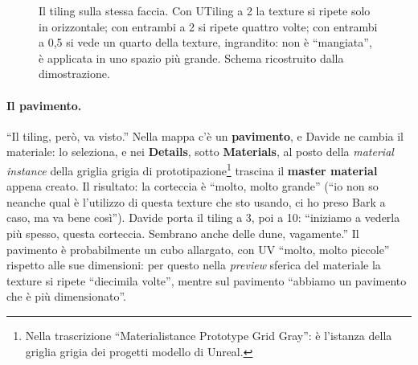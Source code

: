\begin{figure}[htbp]
\centering
{}
\caption{Il tiling sulla stessa faccia. Con UTiling a 2 la texture si ripete solo in
orizzontale; con entrambi a 2 si ripete quattro volte; con entrambi a 0,5 si vede un
quarto della texture, ingrandito: non è ``mangiata'', è applicata in uno spazio più
grande. Schema ricostruito dalla dimostrazione.}
\label{ue3:fig:tiling}
\end{figure}

\paragraph{Il pavimento.} ``Il tiling, però, va visto.'' Nella mappa c'è un
\textbf{pavimento}, e Davide ne cambia il materiale: lo seleziona, e nei
\textbf{Details}, sotto \textbf{Materials}, al posto della \emph{material instance}
della griglia grigia di prototipazione\footnote{Nella trascrizione ``Materialistance
Prototype Grid Gray'': è l'istanza della griglia grigia dei progetti modello di
Unreal.} trascina il \textbf{master material} appena creato. Il risultato: la corteccia
è ``molto, molto grande'' (``io non so neanche qual è l'utilizzo di questa texture che
sto usando, ci ho preso Bark a caso, ma va bene così''). Davide porta il tiling a 3,
poi a 10: ``iniziamo a vederla più spesso, questa corteccia. Sembrano anche delle dune,
vagamente.'' Il pavimento è probabilmente un cubo allargato, con UV ``molto, molto
piccole'' rispetto alle sue dimensioni: per questo nella \emph{preview} sferica del
materiale la texture si ripete ``diecimila volte'', mentre sul pavimento ``abbiamo un
pavimento che è più dimensionato''.

